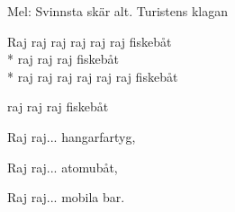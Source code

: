 \begin{SongText}[Fiskebåt]
    \begin{SongInfo}
        Mel: Svinnsta skär alt. Turistens klagan
    \end{SongInfo}
    \begin{SongVerse}
        Raj raj raj raj raj raj fiskebåt\\*%
        raj raj raj fiskebåt\\*%
        raj raj raj raj raj raj fiskebåt
    \end{SongVerse}
    \begin{SongVerse}
        raj raj raj fiskebåt
    \end{SongVerse}
    \begin{SongVerse}
        Raj raj... hangarfartyg,
    \end{SongVerse}
    \begin{SongVerse}
        Raj raj... atomubåt,
    \end{SongVerse}
    \begin{SongVerse}
        Raj raj... mobila bar.
    \end{SongVerse}
\end{SongText}